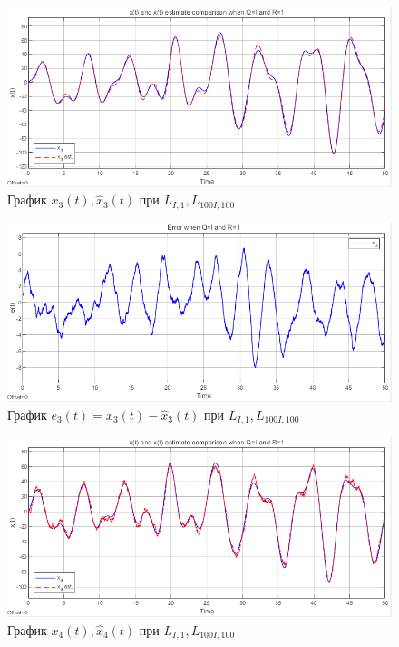 \documentclass[a4paper, 12pt]{article}
\begin{document}
    \begin{figure}[H]
        \centering
        \includegraphics[scale=0.75]{2task_x3.png}
        \captionsetup{skip=0pt}
        \caption{График $x_3(t),\hat{x}_3(t)$ при $L_{I,1},L_{100I,100}$}
        \label{fig:2task_x3}
    \end{figure}
    \begin{figure}[H]
        \centering
        \includegraphics[scale=0.75]{2task_e3.png}
        \captionsetup{skip=0pt}
        \caption{График $e_3(t)=x_3(t)-\hat{x}_3(t)$ при $L_{I,1},L_{100I,100}$}
        \label{fig:2task_e3}
    \end{figure}
    \begin{figure}[H]
        \centering
        \includegraphics[scale=0.75]{2task_x4.png}
        \captionsetup{skip=0pt}
        \caption{График $x_4(t),\hat{x}_4(t)$ при $L_{I,1},L_{100I,100}$}
        \label{fig:2task_x4}
    \end{figure}
\end{document}
